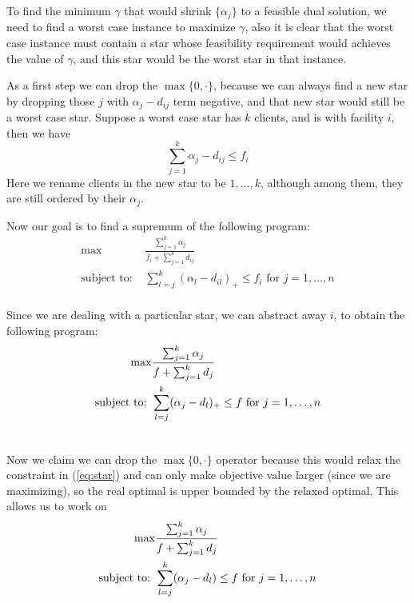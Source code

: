 \documentclass{article}
\begin{document}
To find the minimum $\gamma$ that would shrink
$\{\alpha_j\}$ to a feasible dual solution, we need to find
a worst case instance to maximize $\gamma$, also it is clear
that the worst case instance must contain a star whose
feasibility requirement would achieves the value of
$\gamma$, and this star would be the worst star in that
instance.

As a first step we can drop the $\max\{0, \cdot\}$, because
we can always find a new star by dropping those $j$ with
$\alpha_j - d_{ij}$ term negative, and that new star would
still be a worst case star. Suppose a worst case star has
$k$ clients, and is with facility $i$, then we have
\begin{equation*}
  \sum_{j=1}^k \alpha_j - d_{ij} \leq f_i
\end{equation*}
Here we rename clients in the new star to be $1,\ldots,k$,
although among them, they are still ordered by their
$\alpha_j$.

Now our goal is to find a supremum of the following program:
\begin{align*}
  \max & \frac{\sum_{j=1}^k \alpha_j}{f_i + \sum_{j=1}^k d_{ij}}\\
  \textrm{subject to: } & \sum_{l=j}^k (\alpha_l -
  d_{il})_+\leq f_i \textrm{ for } j=1,\ldots,n\\
\end{align*}

Since we are dealing with a particular star, we can abstract
away $i$, to obtain the following program:
\begin{align}
  \label{eq:star}
  \max & \frac{\sum_{j=1}^k \alpha_j}{f + \sum_{j=1}^k
    d_j}\\ \notag
  \textrm{subject to: } & \sum_{l=j}^k (\alpha_j - d_{l})_+
  \leq f \textrm{ for } j=1,\ldots,n\\ \notag
\end{align}

Now we claim we can drop the $\max\{0, \cdot\}$ operator
because this would relax the constraint in (\ref{eq:star})
and can only make objective value larger (since we are
maximizing), so the real optimal is upper bounded by the
relaxed optimal. This allows us to work on
\begin{align}
  \label{eq:frlp}
  \max & \frac{\sum_{j=1}^k \alpha_j}{f + \sum_{j=1}^k
    d_j}\\ \notag
  \textrm{subject to: } & \sum_{l=j}^k (\alpha_j - d_{l})
  \leq f \textrm{ for } j=1,\ldots,n\\ \notag
\end{align}
\end{document}
